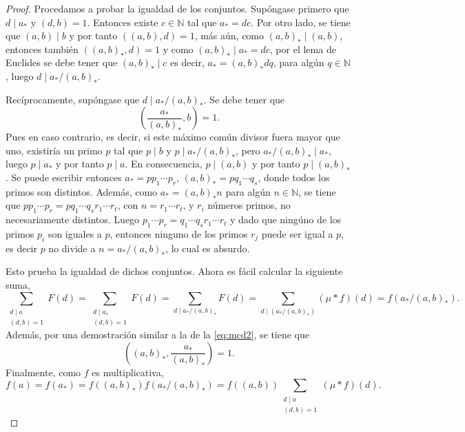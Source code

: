 \begin{proof}
Procedamos a probar la igualdad de los conjuntos. Supóngase primero que $d \mid a_*$ y $(d,b)=1$. Entonces existe $c \in \mathbb{N}$ tal que $a_*=d c$. Por otro lado, se tiene que $(a,b) \mid b$ y por tanto $((a,b),d)=1$, más aún, como $(a,b)_* \mid (a,b)$, entonces también $((a,b)_*,d)=1$ y como $(a,b)_* \mid a_* = d c$, por el lema de Euclides se debe tener que $(a,b)_* \mid c$ es decir, $a_* = (a,b)_* d q$, para algún $q \in \mathbb{N}$, luego $d \mid a_* / (a,b)_*$.
\bigskip

Recíprocamente, supóngase que $d \mid a_*/(a,b)_*$. Se debe tener que
\begin{equation}\label{eq:mcd2}
    \left( \frac{a_*}{(a,b)_*},b \right) = 1.
\end{equation}
Pues en caso contrario, es decir, si este máximo común divisor fuera mayor que uno, existiría un primo $p$ tal que $p \mid b$ y $p \mid a_*/(a,b)_*$, pero $a_*/(a,b)_* \mid a_*$, luego $p \mid a_*$ y por tanto $p \mid a$. En consecuencia, $p \mid (a,b)$ y por tanto $p \mid (a,b)_*$. Se puede escribir entonces $a_*=p p_1 \cdots p_r$, $(a,b)_*= p q_1 \cdots q_s$, donde todos los primos son distintos. Además, como $a_*=(a,b)_* n$ para algún $n \in \mathbb{N}$, se tiene que
$p p_1 \cdots p_r = p q_1 \cdots q_s r_1 \cdots r_t$, con $n=r_1 \cdots r_t$, y $r_i$ números primos, no necesariamente distintos. Luego $p_1 \cdots p_r = q_1 \cdots q_s r_1 \cdots r_t$ y dado que ningúno de los primos $p_i$ son iguales a $p$, entonces ninguno de los primos $r_j$ puede ser igual a $p$, es decir $p$ no divide a $n=a_*/(a,b)_*$, lo cual es absurdo.
\bigskip

Esto prueba la igualdad de dichos conjuntos. Ahora es fácil calcular la siguiente suma,
\begin{equation*}
    \sum_{\substack{d \mid a \\ (d,b)=1}} F(d) = \sum_{\substack{ d \mid a_* \\ (d,b)=1}} F(d) = \sum_{d \mid a_* / (a,b)_*} F(d) = \sum_{d \mid (a_*/(a,b)_*)} (\mu * f)(d) = f(a_*/(a,b)_*).
\end{equation*}
Además, por una demostración similar a la de la \cref{eq:mcd2}, se tiene que
\begin{equation*}
    \left( (a,b)_*,\frac{a_*}{(a,b)_*} \right) = 1.
\end{equation*}
Finalmente, como $f$ es multiplicativa,
\begin{equation*}
    f(a) = f(a_*) = f((a,b)_*)f(a_*/(a,b)_*) = f((a,b)) \sum_{\substack{d \mid a \\ (d,b)=1}} (\mu * f)(d).
\end{equation*}
\end{proof}

